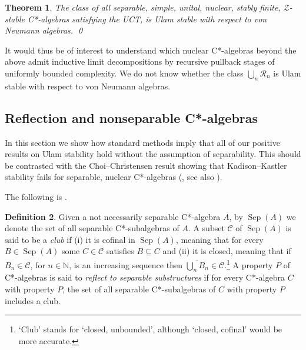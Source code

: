\documentclass[11pt]{amsproc}
\newcommand{\bbN}{\mathbb N}
\DeclareMathOperator{\Sep}{Sep}
\newcommand{\cstar}{C*}
\newcommand{\cC}{\mathcal C}
\newcommand{\cR}{\mathcal R}
\theoremstyle{definition}
\newtheorem{definition}{Definition}[section]
\theoremstyle{plain}
\newtheorem{theorem}[definition]{Theorem}
\theoremstyle{remark}
\begin{document}
\begin{theorem} \label{T.Classifiable}
	The class of all separable, simple, unital, nuclear, stably finite, $\mathcal Z$-stable \cstar-algebras satisfying the UCT, is Ulam stable with respect to von Neumann algebras. \qed 
\end{theorem}



It would thus be of interest to understand which nuclear \cstar-algebras beyond the above admit inductive limit decompositions by recursive pullback stages of uniformly bounded complexity.
We do not know whether the class $\bigcup_n \cR_n$ is Ulam stable with respect to von Neumann algebras. 


\subsection{Reflection and nonseparable \cstar-algebras}\label{S.Reflection}

In this section we show how standard methods  imply that all of our positive results on Ulam stability hold without the assumption of separability. This should be contrasted with the Choi--Christensen result showing that Kadison--Kastler stability fails for separable, nuclear \cstar-algebras (\cite{choi1983completely}, see also \cite[\S 14.4]{FarahCT}). 

The following is \cite[Definition~7.3.1]{FarahCT}. 

\begin{definition}
Given a not necessarily separable \cstar-algebra $A$, by $\Sep(A)$ we denote the set of all separable \cstar-subalgebras of $A$. A subset $\cC$ of $\Sep(A)$ is said to be a \emph{club} if (i) it is cofinal in $\Sep(A)$, meaning that for every $B\in \Sep(A)$ some $C\in \cC$ satisfies $B\subseteq C$ and (ii) it is closed, meaning that if $B_n\in \cC$, for $n\in \bbN$, is an increasing sequence then $\overline {\bigcup_n B_n}\in \cC$.\footnote{`Club' stands for `closed, unbounded', although  `closed, cofinal' would be more accurate.}
A property $P$ of \cstar-algebras is said to \emph{reflect to separable substructures} if for every \cstar-algebra $C$ with property $P$, the set of all separable \cstar-subalgebras of $C$ with property $P$ includes a club. 
\end{definition}
\end{document}
